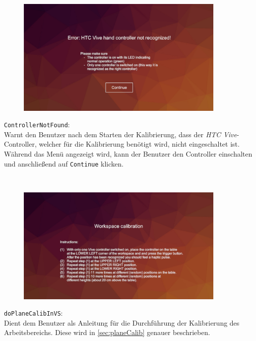 \begin{minipage}{0.6\textwidth}
	\begin{figure}[H] 
		\includegraphics[trim=3cm 1cm 3cm 3cm, clip, width=0.9\textwidth]{Bilder/ControllerNotFound.jpg}
			\label{fig:ControllerNotFound}
	\end{figure}
\end{minipage}
\begin{minipage}{0.4\textwidth}
	\texttt{ControllerNotFound}:\\
	Warnt den Benutzer nach dem Starten der Kalibrierung, dass der \textit{HTC Vive}-Controller, welcher für die Kalibrierung benötigt wird, nicht eingeschaltet ist. Während das Menü angezeigt wird, kann der Benutzer den Controller einschalten und anschließend auf \texttt{Continue} klicken.
\end{minipage}\\

\begin{minipage}{0.6\textwidth}
	\begin{figure}[H] 
		\includegraphics[trim=3cm 1cm 3cm 3cm, clip, width=0.9\textwidth]{Bilder/doPlaneCalibInVS.jpg}
			\label{fig:doPlaneCalibInVS}
	\end{figure}
\end{minipage}
\begin{minipage}{0.4\textwidth}
	\texttt{doPlaneCalibInVS}:\\
	Dient dem Benutzer als Anleitung für die Durchführung der Kalibrierung des Arbeitsbereichs. Diese wird in \ref{sec:planeCalib} genauer beschrieben.
\end{minipage}\\

